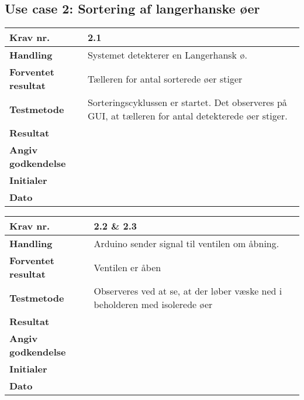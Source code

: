 \newpage
 \subsection{Use case 2: Sortering af langerhanske øer}

	\begin{center}
		\begin{longtable}{ | m{4cm}| m{8.5cm}|} 
			\hline
			\textbf{Krav nr.} & 2.1  \\ 
			\hline
			\textbf{Handling} & Systemet detekterer en Langerhansk ø.  \\
			\hline
			\textbf{Forventet resultat} & Tælleren for antal sorterede øer stiger \\
			\hline
			\textbf{Testmetode}  & Sorteringscyklussen er startet. Det observeres på GUI, at tælleren for antal detekterede øer stiger.   \\
			\hline
			\textbf{Resultat}  &    \\
			\hline
			\textbf{Angiv godkendelse} &     \\
			\hline
			\textbf{Initialer} &     \\
			\hline
			\textbf{Dato} &    \\
			\hline
		\end{longtable}
	\end{center}	
	
	\begin{center}
		\begin{longtable}{ | m{4cm}| m{8.5cm}|} 
			\hline
			\textbf{Krav nr.} & 2.2 \& 2.3  \\ 
			\hline
			\textbf{Handling} & Arduino sender signal til ventilen om åbning.  \\
			\hline
			\textbf{Forventet resultat} & Ventilen er åben \\
			\hline
			\textbf{Testmetode}  & Observeres ved at se, at der løber væske ned i beholderen med isolerede øer  \\
			\hline
			\textbf{Resultat}  &    \\
			\hline
			\textbf{Angiv godkendelse} &     \\
			\hline
			\textbf{Initialer} &     \\
			\hline
			\textbf{Dato} &    \\
			\hline
		\end{longtable}
	\end{center}	
	
	

